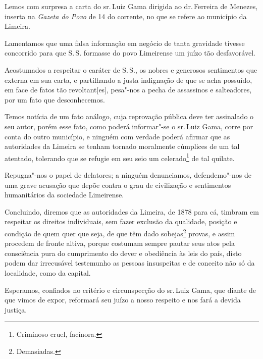 \noindent{}Lemos com surpresa a carta do sr.\,Luiz Gama dirigida ao dr.\,Ferreira de
Menezes, inserta na \emph{Gazeta do Povo} de 14 do corrente, no que se
refere ao município da Limeira.

Lamentamos que uma falsa informação em negócio de tanta gravidade
tivesse concorrido para que S.\,S. formasse do povo Limeirense um juízo
tão desfavorável.

Acostumados a respeitar o caráter de S.\,S., os nobres e generosos
sentimentos que externa em sua carta, e partilhando a justa indignação
de que se acha possuído, em face de fatos tão revoltant{[}es{]},
pesa"-nos a pecha de assassinos e salteadores, por um fato que
desconhecemos.


Temos notícia de um fato análogo, cuja reprovação pública deve ter
assinalado o seu autor, porém esse fato, como poderá informar"-se o sr.\,Luiz Gama, corre por conta do outro município, e ninguém com verdade
poderá afirmar que as autoridades da Limeira se tenham tornado
moralmente cúmplices de um tal atentado, tolerando que se refugie em seu
seio um celerado\footnote{Criminoso cruel, facínora.} de tal quilate.

Repugna"-nos o papel de delatores; a ninguém denunciamos, defendemo"-nos
de uma grave acusação que depõe contra o grau de civilização e
sentimentos humanitários da sociedade Limeirense.

Concluindo, diremos que as autoridades da Limeira, de 1878 para cá,
timbram em respeitar os direitos individuais, sem fazer exclusão da
qualidade, posição e condição de quem quer que seja, de que têm dado
sobejas\footnote{Demasiadas.} provas, e assim procedem de fronte
altiva, porque costumam sempre pautar seus atos pela consciência pura do
cumprimento do dever e obediência às leis do país, disto podem dar
irrecusável testemunho as pessoas insuspeitas e de conceito não só da
localidade, como da capital.

Esperamos, confiados no critério e circunspecção do sr.\,Luiz Gama, que
diante de que vimos de expor, reformará seu juízo a nosso respeito e nos
fará a devida justiça.

\vfill

